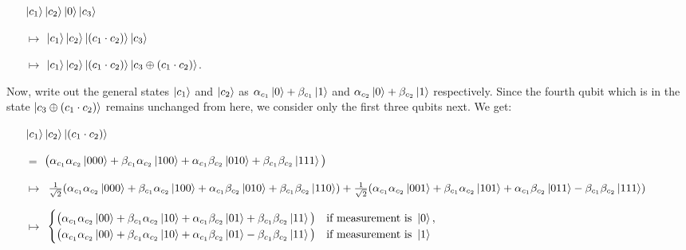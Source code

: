 \documentclass[12pt]{dalthesis}
\begin{document}
\begin{itemize}
\item[] $\ket{c_1}\ket{c_2}\ket{0} \ket{c_3}$
\item[$\mapsto$] $\ket{c_1}\ket{c_2}\ket{(c_1 \cdot c_2)} \ket{c_3}$
\item[$\mapsto$] $\ket{c_1}\ket{c_2}\ket{(c_1 \cdot c_2)} \ket{c_3 \oplus (c_1 \cdot c_2)}$.
\end{itemize}
Now, write out the general states $\ket{c_1}$ and $\ket{c_2}$ as $\alpha_{c_1} \ket{0} + \beta_{c_1} \ket{1}$ and $\alpha_{c_2} \ket{0} + \beta_{c_2} \ket{1}$ respectively. Since the fourth qubit which is in the state $\ket{c_3 \oplus (c_1 \cdot c_2)}$ remains unchanged from here, we consider only the first three qubits next. We get:
\begin{itemize}
\item[] $\ket{c_1}\ket{c_2}\ket{(c_1 \cdot c_2)}$
\item[$=$] $\big(  \alpha_{c_1}\alpha_{c_2} \ket{000} + \beta_{c_1}\alpha_{c_2} \ket{100} + \alpha_{c_1}\beta_{c_2} \ket{010} + \beta_{c_1}\beta_{c_2} \ket{111} \big)$

\item[$\mapsto$] $\frac{1}{\sqrt{2}} (\alpha_{c_1}\alpha_{c_2} \ket{000} + \beta_{c_1}\alpha_{c_2} \ket{100} + \alpha_{c_1}\beta_{c_2} \ket{010} + \beta_{c_1}\beta_{c_2} \ket{110}) +\frac{1}{\sqrt{2}} (\alpha_{c_1}\alpha_{c_2} \ket{001} + \beta_{c_1}\alpha_{c_2} \ket{101} + \alpha_{c_1}\beta_{c_2} \ket{011} - \beta_{c_1}\beta_{c_2} \ket{111})$



\item[$\mapsto$] 
$\begin{cases} \big( \alpha_{c_1}\alpha_{c_2} \ket{00} + \beta_{c_1}\alpha_{c_2} \ket{10} + \alpha_{c_1}\beta_{c_2} \ket{01} + \beta_{c_1}\beta_{c_2} \ket{11} \big) & \mbox{if measurement is } \ket{0} , \\
\big( \alpha_{c_1}\alpha_{c_2} \ket{00} + \beta_{c_1}\alpha_{c_2} \ket{10} + \alpha_{c_1}\beta_{c_2} \ket{01} - \beta_{c_1}\beta_{c_2} \ket{11} \big) & \mbox{if measurement is } \ket{1} \end{cases}$


\end{itemize}
\end{document}
